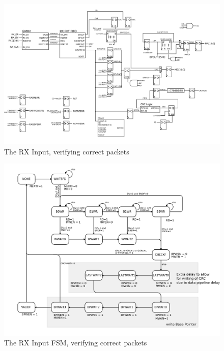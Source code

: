 \begin{figure}
\label{rxinput}
\includegraphics[scale=0.7]{rxinput.svg}
\caption{The RX Input, verifying correct packets}

\end{figure}

\begin{figure}
\label{rxinputfsm}
\includegraphics[scale=0.7]{rxinput.fsm.svg}
\caption{The RX Input FSM, verifying correct packets}
\end{figure}

